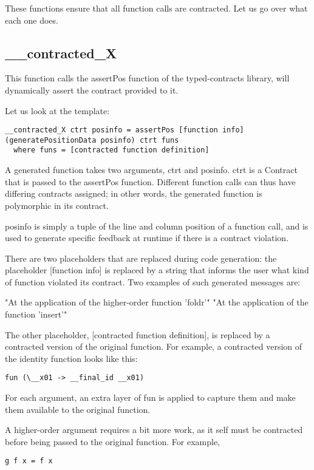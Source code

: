 \documentclass[10pt,a4paper]{article}
\begin{document}
These functions ensure that all function calls are contracted. Let us go over what each one does.

\subsection{\_\_contracted\_X}
This function calls the assertPos function of the typed-contracts library, will dynamically assert the contract provided to it.


Let us look at the template:

\begin{lstlisting}
__contracted_X ctrt posinfo = assertPos [function info] (generatePositionData posinfo) ctrt funs
  where funs = [contracted function definition]
\end{lstlisting}

A generated function takes two arguments, ctrt and posinfo.
ctrt is a Contract that is passed to the assertPos function. 
Different function calls can thus have differing contracts assigned;
in other words, the generated function is polymorphic in its contract.

posinfo is simply a tuple of the line and column position of a function call, and is used to generate specific feedback at runtime if there is a contract violation.

There are two placeholders that are replaced during code generation:
the placeholder [function info] is replaced by a string that informs the user what kind of function violated its contract.
Two examples of such generated messages are:

"At the application of the higher-order function 'foldr'"
"At the application of the function 'insert'"

The other placeholder, [contracted function definition], is replaced by a contracted version of the original function.
For example, a contracted version of the identity function looks like this:

\begin{lstlisting}
fun (\__x01 -> __final_id __x01)
\end{lstlisting}

For each argument, an extra layer of fun is applied to capture them and make them available to the original function.

A higher-order argument requires a bit more work, as it self must be contracted before being passed to the original function.
For example,

\begin{lstlisting}
g f x = f x
\end{lstlisting}
\end{document}
